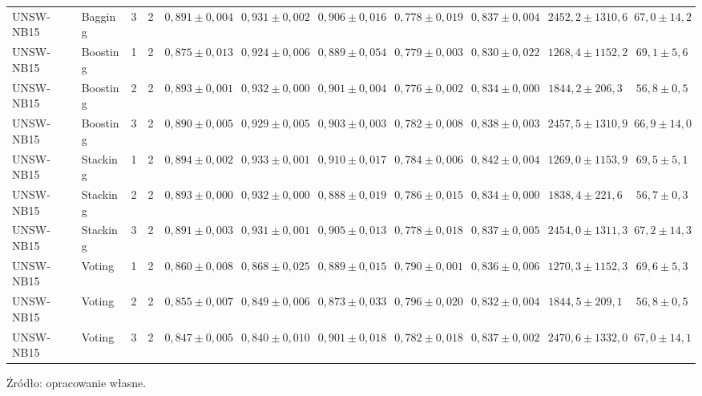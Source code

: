\begin{table}[H]
{\begin{tabular}{llllccccccc}
UNSW-NB15 & Bagging & 3 & 2 & $0{,}891 \pm 0{,}004$ & $0{,}931 \pm 0{,}002$ & $0{,}906 \pm 0{,}016$ & $0{,}778 \pm 0{,}019$ & $0{,}837 \pm 0{,}004$ & $2452{,}2 \pm 1310{,}6$ & $67{,}0 \pm 14{,}2$ \\
UNSW-NB15 & Boosting & 1 & 2 & $0{,}875 \pm 0{,}013$ & $0{,}924 \pm 0{,}006$ & $0{,}889 \pm 0{,}054$ & $0{,}779 \pm 0{,}003$ & $0{,}830 \pm 0{,}022$ & $1268{,}4 \pm 1152{,}2$ & $69{,}1 \pm 5{,}6$ \\
UNSW-NB15 & Boosting & 2 & 2 & $0{,}893 \pm 0{,}001$ & $0{,}932 \pm 0{,}000$ & $0{,}901 \pm 0{,}004$ & $0{,}776 \pm 0{,}002$ & $0{,}834 \pm 0{,}000$ & $1844{,}2 \pm 206{,}3$ & $56{,}8 \pm 0{,}5$ \\
UNSW-NB15 & Boosting & 3 & 2 & $0{,}890 \pm 0{,}005$ & $0{,}929 \pm 0{,}005$ & $0{,}903 \pm 0{,}003$ & $0{,}782 \pm 0{,}008$ & $0{,}838 \pm 0{,}003$ & $2457{,}5 \pm 1310{,}9$ & $66{,}9 \pm 14{,}0$ \\
UNSW-NB15 & Stacking & 1 & 2 & $0{,}894 \pm 0{,}002$ & $0{,}933 \pm 0{,}001$ & $0{,}910 \pm 0{,}017$ & $0{,}784 \pm 0{,}006$ & $0{,}842 \pm 0{,}004$ & $1269{,}0 \pm 1153{,}9$ & $69{,}5 \pm 5{,}1$ \\
UNSW-NB15 & Stacking & 2 & 2 & $0{,}893 \pm 0{,}000$ & $0{,}932 \pm 0{,}000$ & $0{,}888 \pm 0{,}019$ & $0{,}786 \pm 0{,}015$ & $0{,}834 \pm 0{,}000$ & $1838{,}4 \pm 221{,}6$ & $56{,}7 \pm 0{,}3$ \\
UNSW-NB15 & Stacking & 3 & 2 & $0{,}891 \pm 0{,}003$ & $0{,}931 \pm 0{,}001$ & $0{,}905 \pm 0{,}013$ & $0{,}778 \pm 0{,}018$ & $0{,}837 \pm 0{,}005$ & $2454{,}0 \pm 1311{,}3$ & $67{,}2 \pm 14{,}3$ \\
UNSW-NB15 & Voting & 1 & 2 & $0{,}860 \pm 0{,}008$ & $0{,}868 \pm 0{,}025$ & $0{,}889 \pm 0{,}015$ & $0{,}790 \pm 0{,}001$ & $0{,}836 \pm 0{,}006$ & $1270{,}3 \pm 1152{,}3$ & $69{,}6 \pm 5{,}3$ \\
UNSW-NB15 & Voting & 2 & 2 & $0{,}855 \pm 0{,}007$ & $0{,}849 \pm 0{,}006$ & $0{,}873 \pm 0{,}033$ & $0{,}796 \pm 0{,}020$ & $0{,}832 \pm 0{,}004$ & $1844{,}5 \pm 209{,}1$ & $56{,}8 \pm 0{,}5$ \\
UNSW-NB15 & Voting & 3 & 2 & $0{,}847 \pm 0{,}005$ & $0{,}840 \pm 0{,}010$ & $0{,}901 \pm 0{,}018$ & $0{,}782 \pm 0{,}018$ & $0{,}837 \pm 0{,}002$ & $2470{,}6 \pm 1332{,}0$ & $67{,}0 \pm 14{,}1$ \\
\hline
\end{tabular}}
\end{table}

Źródło: opracowanie własne.